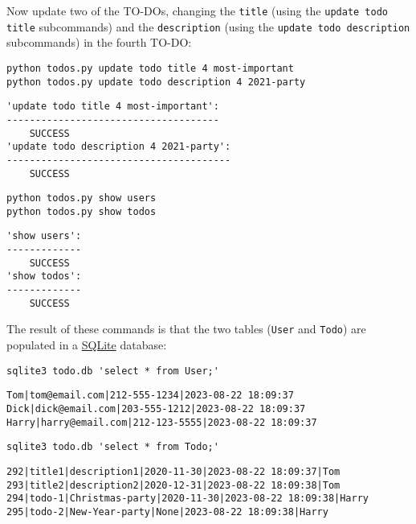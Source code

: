 \documentclass[10pt]{amsart}
\numberwithin{equation}{section}
\begin{document}
Now update two of the TO-DOs, changing the \texttt{title} (using the \texttt{update todo
title} subcommands) and the \texttt{description} (using the \texttt{update todo description}
subcommands) in the fourth TO-DO:
\begin{verbatim}
python todos.py update todo title 4 most-important
python todos.py update todo description 4 2021-party
\end{verbatim}

\begin{verbatim}
'update todo title 4 most-important':
-------------------------------------
	SUCCESS
'update todo description 4 2021-party':
---------------------------------------
	SUCCESS
\end{verbatim}


\begin{verbatim}
python todos.py show users
python todos.py show todos
\end{verbatim}

\begin{verbatim}
'show users':
-------------
	SUCCESS
'show todos':
-------------
	SUCCESS
\end{verbatim}


The result of these commands is that the two tables (\texttt{User} and \texttt{Todo})
are populated in a \href{https://www.sqlite.org/index.html}{SQLite} database:
\begin{verbatim}
sqlite3 todo.db 'select * from User;'
\end{verbatim}

\begin{verbatim}
Tom|tom@email.com|212-555-1234|2023-08-22 18:09:37
Dick|dick@email.com|203-555-1212|2023-08-22 18:09:37
Harry|harry@email.com|212-123-5555|2023-08-22 18:09:37
\end{verbatim}


\begin{verbatim}
sqlite3 todo.db 'select * from Todo;'
\end{verbatim}

\begin{verbatim}
292|title1|description1|2020-11-30|2023-08-22 18:09:37|Tom
293|title2|description2|2020-12-31|2023-08-22 18:09:38|Tom
294|todo-1|Christmas-party|2020-11-30|2023-08-22 18:09:38|Harry
295|todo-2|New-Year-party|None|2023-08-22 18:09:38|Harry
\end{verbatim}
\end{document}
